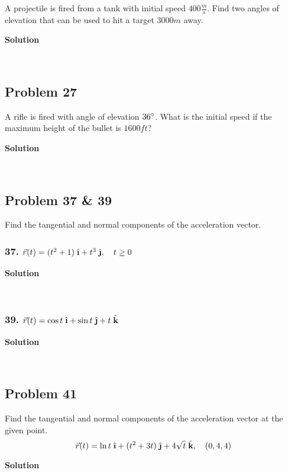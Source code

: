 \documentclass{article}
\newcommand{\ihat}{\;\hat{\textbf{\i}}}
\newcommand{\jhat}{\;\hat{\textbf{\j}}}
\newcommand{\khat}{\;\hat{\textbf{k}}}
\newcommand{\rvec}{\vec{r}(t)}
\begin{document}
A projectile is fired from a tank with initial speed $400 \frac m s$. Find two angles of elevation that can be used to hit a target $3000m$ away.

\centerline{\textbf{Solution}} \\
\subsection*{Problem 27}

A rifle is fired with angle of elevation $36\degree$. What is the initial speed if the maximum height of the bullet is $1600 ft$?

\centerline{\textbf{Solution}} \\
\subsection*{Problem 37 \& 39}

Find the tangential and normal components of the acceleration vector.

\subsubsection*{37. $\rvec = (t^2 + 1)\ihat + t^3\jhat, \quad t \geq 0    $}
\centerline{\textbf{Solution}} \\
\subsubsection*{39. $\rvec = \cos t\ihat + \sin t\jhat + t\khat$}
\centerline{\textbf{Solution}} \\
\subsection*{Problem 41}

Find the tangential and normal components of the acceleration vector at the given point.
\[
    \rvec = \ln t\ihat + (t^2 + 3t)\jhat + 4\sqrt t\khat, \quad (0, 4, 4)
\]
\centerline{\textbf{Solution}} \\
\end{document}

